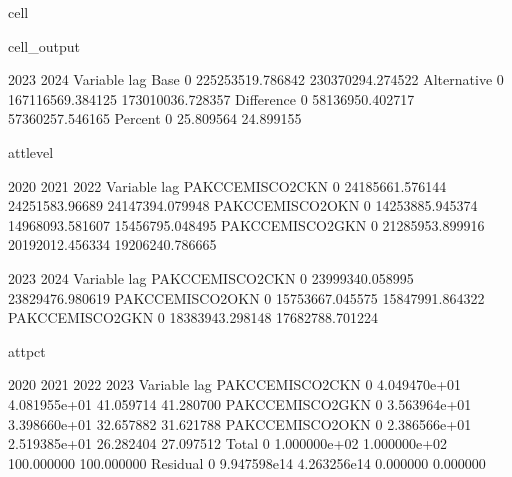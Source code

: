 \documentclass[letterpaper,10pt,english]{jupyterBook}
\begin{document}
\begin{sphinxuseclass}{cell}
\begin{sphinxVerbatimOutput}
\begin{sphinxuseclass}{cell_output}
\begin{sphinxVerbatim}[commandchars=\\\{\}]
                             2023              2024  
Variable    lag                                      
Base        0    225253519.786842  230370294.274522  
Alternative 0    167116569.384125  173010036.728357  
Difference  0    \PYGZhy{}58136950.402717  \PYGZhy{}57360257.546165  
Percent     0          \PYGZhy{}25.809564        \PYGZhy{}24.899155  
\end{sphinxVerbatim}

\begin{sphinxVerbatim}[commandchars=\\\{\}]
\PYGZsq{}att\PYGZus{}level\PYGZsq{}
\end{sphinxVerbatim}

\begin{sphinxVerbatim}[commandchars=\\\{\}]
                                2020             2021             2022   
Variable        lag                                                      
PAKCCEMISCO2CKN 0   \PYGZhy{}24185661.576144  \PYGZhy{}24251583.96689 \PYGZhy{}24147394.079948  \PYGZbs{}
PAKCCEMISCO2OKN 0   \PYGZhy{}14253885.945374 \PYGZhy{}14968093.581607 \PYGZhy{}15456795.048495   
PAKCCEMISCO2GKN 0   \PYGZhy{}21285953.899916 \PYGZhy{}20192012.456334 \PYGZhy{}19206240.786665   

                                2023             2024  
Variable        lag                                    
PAKCCEMISCO2CKN 0   \PYGZhy{}23999340.058995 \PYGZhy{}23829476.980619  
PAKCCEMISCO2OKN 0   \PYGZhy{}15753667.045575 \PYGZhy{}15847991.864322  
PAKCCEMISCO2GKN 0   \PYGZhy{}18383943.298148 \PYGZhy{}17682788.701224  
\end{sphinxVerbatim}

\begin{sphinxVerbatim}[commandchars=\\\{\}]
\PYGZsq{}att\PYGZus{}pct\PYGZsq{}
\end{sphinxVerbatim}

\begin{sphinxVerbatim}[commandchars=\\\{\}]
                             2020          2021        2022        2023   
Variable        lag                                                       
PAKCCEMISCO2CKN 0    4.049470e+01  4.081955e+01   41.059714   41.280700  \PYGZbs{}
PAKCCEMISCO2GKN 0    3.563964e+01  3.398660e+01   32.657882   31.621788   
PAKCCEMISCO2OKN 0    2.386566e+01  2.519385e+01   26.282404   27.097512   
Total           0    1.000000e+02  1.000000e+02  100.000000  100.000000   
Residual        0   \PYGZhy{}9.947598e\PYGZhy{}14  4.263256e\PYGZhy{}14    0.000000    0.000000   


\end{sphinxVerbatim}
\end{sphinxuseclass}
\end{sphinxVerbatimOutput}
\end{sphinxuseclass}
\end{document}

